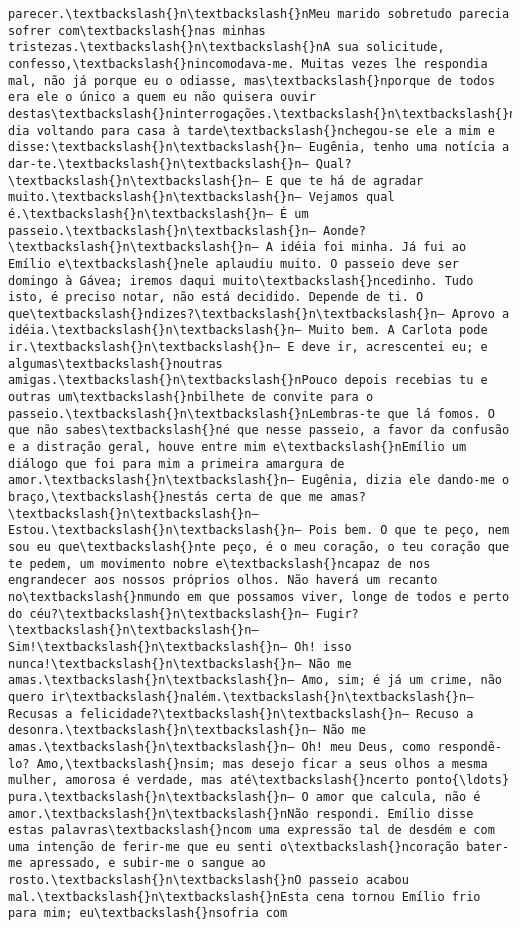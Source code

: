 \documentclass[11pt]{article}
\begin{document}
\begin{Verbatim}[commandchars=\\\{\}]
parecer.\textbackslash{}n\textbackslash{}nMeu marido sobretudo parecia sofrer com\textbackslash{}nas minhas tristezas.\textbackslash{}n\textbackslash{}nA sua solicitude, confesso,\textbackslash{}nincomodava-me. Muitas vezes lhe respondia mal, não já porque eu o odiasse, mas\textbackslash{}nporque de todos era ele o único a quem eu não quisera ouvir destas\textbackslash{}ninterrogações.\textbackslash{}n\textbackslash{}nUm dia voltando para casa à tarde\textbackslash{}nchegou-se ele a mim e disse:\textbackslash{}n\textbackslash{}n— Eugênia, tenho uma notícia a dar-te.\textbackslash{}n\textbackslash{}n— Qual?\textbackslash{}n\textbackslash{}n— E que te há de agradar muito.\textbackslash{}n\textbackslash{}n— Vejamos qual é.\textbackslash{}n\textbackslash{}n— É um passeio.\textbackslash{}n\textbackslash{}n— Aonde?\textbackslash{}n\textbackslash{}n— A idéia foi minha. Já fui ao Emílio e\textbackslash{}nele aplaudiu muito. O passeio deve ser domingo à Gávea; iremos daqui muito\textbackslash{}ncedinho. Tudo isto, é preciso notar, não está decidido. Depende de ti. O que\textbackslash{}ndizes?\textbackslash{}n\textbackslash{}n— Aprovo a idéia.\textbackslash{}n\textbackslash{}n— Muito bem. A Carlota pode ir.\textbackslash{}n\textbackslash{}n— E deve ir, acrescentei eu; e algumas\textbackslash{}noutras amigas.\textbackslash{}n\textbackslash{}nPouco depois recebias tu e outras um\textbackslash{}nbilhete de convite para o passeio.\textbackslash{}n\textbackslash{}nLembras-te que lá fomos. O que não sabes\textbackslash{}né que nesse passeio, a favor da confusão e a distração geral, houve entre mim e\textbackslash{}nEmílio um diálogo que foi para mim a primeira amargura de amor.\textbackslash{}n\textbackslash{}n— Eugênia, dizia ele dando-me o braço,\textbackslash{}nestás certa de que me amas?\textbackslash{}n\textbackslash{}n— Estou.\textbackslash{}n\textbackslash{}n— Pois bem. O que te peço, nem sou eu que\textbackslash{}nte peço, é o meu coração, o teu coração que te pedem, um movimento nobre e\textbackslash{}ncapaz de nos engrandecer aos nossos próprios olhos. Não haverá um recanto no\textbackslash{}nmundo em que possamos viver, longe de todos e perto do céu?\textbackslash{}n\textbackslash{}n— Fugir?\textbackslash{}n\textbackslash{}n— Sim!\textbackslash{}n\textbackslash{}n— Oh! isso nunca!\textbackslash{}n\textbackslash{}n— Não me amas.\textbackslash{}n\textbackslash{}n— Amo, sim; é já um crime, não quero ir\textbackslash{}nalém.\textbackslash{}n\textbackslash{}n— Recusas a felicidade?\textbackslash{}n\textbackslash{}n— Recuso a desonra.\textbackslash{}n\textbackslash{}n— Não me amas.\textbackslash{}n\textbackslash{}n— Oh! meu Deus, como respondê-lo? Amo,\textbackslash{}nsim; mas desejo ficar a seus olhos a mesma mulher, amorosa é verdade, mas até\textbackslash{}ncerto ponto{\ldots} pura.\textbackslash{}n\textbackslash{}n— O amor que calcula, não é amor.\textbackslash{}n\textbackslash{}nNão respondi. Emílio disse estas palavras\textbackslash{}ncom uma expressão tal de desdém e com uma intenção de ferir-me que eu senti o\textbackslash{}ncoração bater-me apressado, e subir-me o sangue ao rosto.\textbackslash{}n\textbackslash{}nO passeio acabou mal.\textbackslash{}n\textbackslash{}nEsta cena tornou Emílio frio para mim; eu\textbackslash{}nsofria com 
\end{Verbatim}
\end{document}
